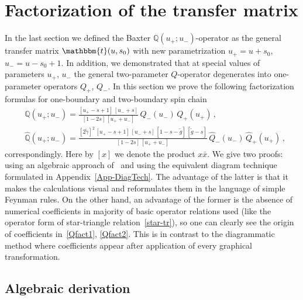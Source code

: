 \documentclass[a4paper,11pt]{article}
\numberwithin{equation}{section}
\begin{document}
\section{Factorization of the transfer matrix} \label{sect:Qfact}
In the last section we defined the Baxter $\mathbb{Q}(u_+;u_-)$-operator as the general transfer matrix $\mathbbm{t}(u,s_0)$ with new parametrization $u_+ = u+s_0$, $u_- = u-s_0+1$.
In addition, we demonstrated that at special values of parameters $u_+$, $u_-$ the general two-parameter $Q$-operator degenerates into one-parameter operators $Q_+$, $Q_-$.
In this section we prove the following factorization formulas for one-boundary and two-boundary spin chain
\begin{align}
	& \label{Qfact1}
	\mathbb{Q}(u_+;u_-) = \frac{[u_+-s+1]\,[u_-+s]}{[1-2s]\,[u_++u_-]}\,Q_-(u_-)\,Q_+(u_+) \,, \\
	& \label{Qfact2}
	\hat{\mathbb{Q}}(u_+;u_-) = \frac{[2\tilde{\gamma}]^2\,[u_+-s+1]\,[u_-+s]\,[1-s-\tilde{g}]\,[\tilde{g}-s]}{[1-2s]\,[u_++u_-]}\,\hat{Q}_-(u_-)\,\hat{Q}_+(u_+) \,,
\end{align}
correspondingly. Here by $[x]$ we denote the product $x\bar{x}$. 
We give two proofs: using an algebraic approach of~\cite{ADV1, ADV2} and using the equivalent diagram technique formulated in Appendix~\ref{App-DiagTech}.
The advantage of the latter is that it makes the calculations visual and reformulates them in the language of simple Feynman rules.
On the other hand, an advantage of the former is the absence of numerical coefficients in majority of basic operator relations used (like the operator form of star-triangle relation~\eqref{star-tr}), so one can clearly see the origin of coefficients in~\eqref{Qfact1}, \eqref{Qfact2}.
This is in contrast to the diagrammatic method where coefficients appear after application of every graphical transformation.


\subsection{Algebraic derivation} \label{sect:algDer}
\end{document}
